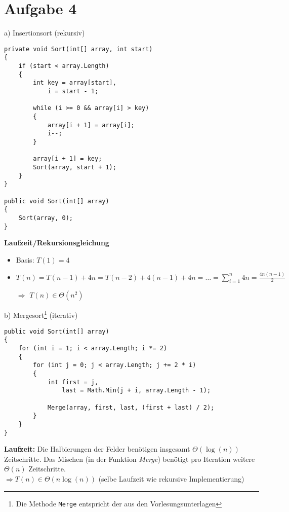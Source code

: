 \section*{Aufgabe 4}
a) Insertionsort (rekursiv)
\begin{verbatim}
private void Sort(int[] array, int start)
{
    if (start < array.Length)
    {
        int key = array[start],
            i = start - 1;

        while (i >= 0 && array[i] > key)
        {
            array[i + 1] = array[i];
            i--;
        }

        array[i + 1] = key;
        Sort(array, start + 1);
    }
}

public void Sort(int[] array)
{
    Sort(array, 0);
}
\end{verbatim}


\textbf{Laufzeit/Rekursionsgleichung}
\begin{itemize}[noitemsep]
	\item Basis: $T(1) = 4$
	\item $T(n) = T(n-1) + 4n = T(n-2) + 4(n-1) + 4n = \ldots = \displaystyle \sum_{i=1}^{n} 4n = \frac{4n(n-1)}{2}$
	\item[$\Rightarrow$] $T(n) \in \Theta(n^2)$
\end{itemize}


b) Mergesort\footnote{Die Methode \texttt{Merge} entspricht der aus den Vorlesungsunterlagen} (iterativ)
\begin{verbatim}
public void Sort(int[] array)
{
    for (int i = 1; i < array.Length; i *= 2)
    {
        for (int j = 0; j < array.Length; j += 2 * i)
        {
            int first = j,
                last = Math.Min(j + i, array.Length - 1);
            
            Merge(array, first, last, (first + last) / 2);
        }
    }
}
\end{verbatim}

\textbf{Laufzeit: } Die Halbierungen der Felder benötigen insgesamt  $\Theta(\log(n))$ Zeitschritte. Das Mischen (in der Funktion \textit{Merge}) benötigt pro Iteration weitere $\Theta(n)$ Zeitschritte. \\
$\Rightarrow T(n) \in \Theta(n \log(n))$ (selbe Laufzeit wie rekursive Implementierung)
